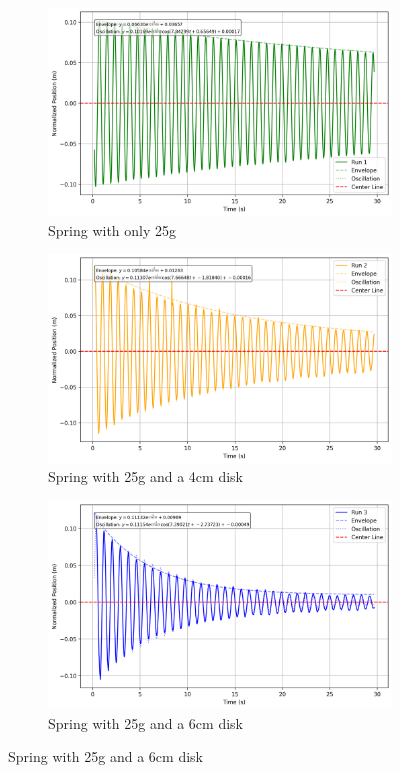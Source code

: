 \documentclass[12pt,letterpaper]{article}
\begin{document}
\begin{figure}[!htb]
\centering
\begin{subfigure}[b]{0.32\textwidth}
  \includegraphics[width=\linewidth]{images/2cm.png}
  \caption{Spring with only 25g}\label{fig:2cm}
\end{subfigure}
\hfill
\begin{subfigure}[b]{0.32\textwidth}
  \includegraphics[width=\linewidth]{images/4cm.png}
  \caption{Spring with 25g and a 4cm disk}\label{fig:4cm}
\end{subfigure}
\hfill
\begin{subfigure}[b]{0.32\textwidth}
  \includegraphics[width=\linewidth]{images/6cm.png}
  \caption{Spring with 25g and a 6cm disk}\label{fig:6cm}
\end{subfigure}


\end{figure}
\end{document}
